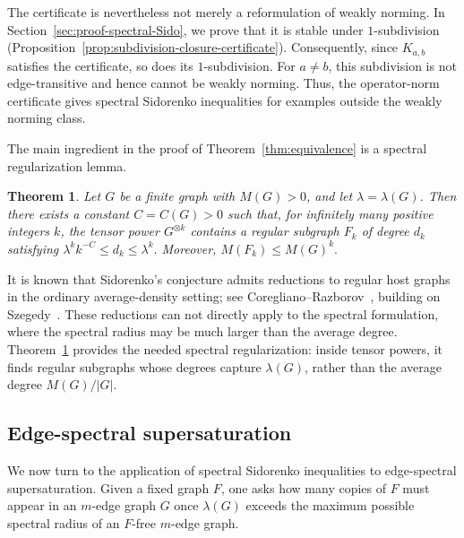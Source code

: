\documentclass[11pt]{article}
\newtheorem{theorem}{Theorem}[section]
\theoremstyle{definition}
\theoremstyle{plain}
\begin{document}
The certificate is nevertheless not merely a reformulation of weakly
norming.  In Section~\ref{sec:proof-spectral-Sido}, we prove that it is
stable under \(1\)-subdivision (Proposition~\ref{prop:subdivision-closure-certificate}).  Consequently, since \(K_{a,b}\) satisfies
the certificate, so does its \(1\)-subdivision.  For \(a\ne b\), this
subdivision is not edge-transitive and hence cannot be weakly norming. Thus, the operator-norm certificate gives spectral
Sidorenko inequalities for examples outside the weakly norming class.


The main ingredient in the proof of Theorem~\ref{thm:equivalence} is a
spectral regularization lemma.

\begin{theorem}
\label{thm:regular-subgraphs}
Let \(G\) be a finite graph with \(M(G)>0\), and let
\(\lambda=\lambda(G)\).  Then there exists a constant \(C=C(G)>0\) such
that, for infinitely many positive integers \(k\), the tensor power
\(G^{\otimes k}\) contains a regular subgraph \(F_k\) of degree \(d_k\)
satisfying      $\lambda^k k^{-C}\le d_k\le \lambda^k .$
Moreover, $ M(F_k)\le M(G)^k.$
\end{theorem}

It is known that Sidorenko's conjecture admits reductions to
regular host graphs in the ordinary average-density setting; see
Coregliano--Razborov~\cite{CoreglianoRazborov2021Biregularity}, building
on Szegedy~\cite{Szegedy2015SparseGraphLimits}.  These reductions can not
directly apply to the spectral formulation, where the spectral radius may
be much larger than the average degree.  Theorem~\ref{thm:regular-subgraphs}
provides the needed spectral regularization: inside tensor powers, it
finds regular subgraphs whose degrees capture \(\lambda(G)\), rather
than the average degree \(M(G)/|G|\).


\subsection{Edge-spectral supersaturation}

We now turn to the application of spectral Sidorenko inequalities to
edge-spectral supersaturation.  Given a fixed graph \(F\), one asks how
many copies of \(F\) must appear in an \(m\)-edge graph \(G\) once
\(\lambda(G)\) exceeds the maximum possible spectral radius of an
\(F\)-free \(m\)-edge graph.
\end{document}
